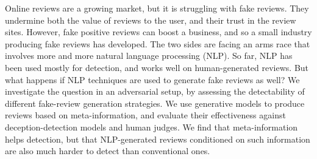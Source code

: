 Online reviews are a growing market, but it is struggling with fake reviews. They undermine both the value of reviews to the user, and their trust in the review sites. However, fake positive reviews can boost a business, and so a small industry producing fake reviews has developed. The two sides are facing an arms race that involves more and more natural language processing (NLP). So far, NLP has been used mostly for detection, and works well on human-generated reviews. But what happens if NLP techniques are used to generate fake reviews as well? We investigate the question in an adversarial setup, by assessing the detectability of different fake-review generation strategies. We use generative models to produce reviews based on meta-information, and evaluate their effectiveness against deception-detection models and human judges. We find that meta-information helps detection, but that NLP-generated reviews conditioned on such information are also much harder to detect than conventional ones.
